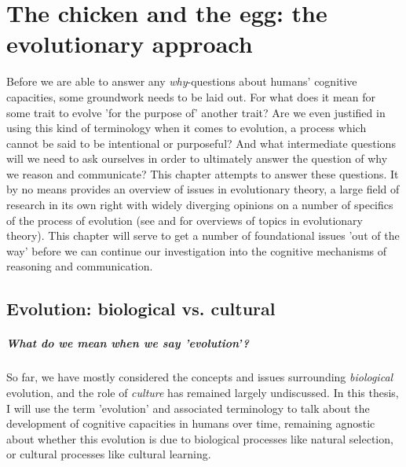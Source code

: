 \chapter{The chicken and the egg: the evolutionary approach}
\label{ch:evolution}

Before we are able to answer any \emph{why}-questions about humans' cognitive capacities, some groundwork needs to be laid out. For what does it mean for some trait to evolve 'for the purpose of' another trait? Are we even justified in using this kind of terminology when it comes to evolution, a process which cannot be said to be intentional or purposeful? And what intermediate questions will we need to ask ourselves in order to ultimately answer the question of why we reason and communicate?
This chapter attempts to  answer these questions. It by no means provides an overview of issues in evolutionary theory, a large field of research in its own right with widely diverging opinions on a number of specifics of the process of evolution (see \citet{Ariew02} and \citet{UllerLaland19} for overviews of topics in evolutionary theory).
This chapter will serve to get a number of foundational issues 'out of the way' before we can continue our investigation into the cognitive mechanisms of reasoning and communication.

\section{Evolution: biological vs. cultural}
\label{sec:evo-bio-culture}

\paragraph{What do we mean when we say 'evolution'?}
So far, we have mostly considered the concepts and issues surrounding \emph{biological} evolution, and the role of \emph{culture} has remained largely undiscussed.
In this thesis, I will use the term 'evolution' and associated terminology to talk about the development of cognitive capacities in humans over time, remaining agnostic about whether this evolution is due to biological processes like natural selection, or cultural processes like cultural learning.

